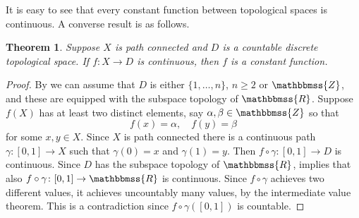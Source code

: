 \documentclass[12pt]{article}
\newcommand{\Z}{\mathbbmss{Z}}
\newcommand{\R}{\mathbbmss{R}}
\newtheorem*{thm*}{Theorem}
\begin{document}
It is easy to see that every constant function between topological 
spaces is continuous. A converse result is as follows.

\begin{thm*}
Suppose $X$ is path connected and $D$ is a countable 
discrete topological space. If $f\colon X\to D$ is continuous,
then $f$ is a constant function.
\end{thm*}

\begin{proof} 
By 
we can assume that $D$ is either $\{1,\ldots, n\}$, $n\ge 2$
or $\Z$, and these are equipped with the subspace topology of $\R$. 
Suppose $f(X)$ has at least two distinct elements, say
$\alpha,\beta\in \Z$ so that 
$$
   f(x)=\alpha, \quad f(y)=\beta
$$
for some $x,y\in X$. Since $X$ is path connected there is a continuous path
$\gamma\colon[0,1]\to X$ such that $\gamma(0)=x$ and $\gamma(1)=y$. 
Then $f\circ\gamma\colon [0,1]\to D$ is continuous. 
Since $D$ has the subspace topology of $\R$, 
 implies that 
also $f\circ\gamma\colon [0,1]\to \R$ is continuous. 
 Since $f\circ \gamma$ 
  achieves two different values, it achieves uncountably many values,
  by the intermediate value theorem. 
 This is a contradiction since $f\circ \gamma([0,1])$
 is countable.
\end{proof}
\end{document}
